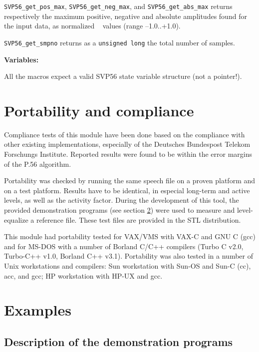 {\tt SVP56\_get\_pos\_max}, {\tt SVP56\_get\_neg\_max}, and 
{\tt SVP56\_get\_abs\_max} returns respectively the maximum
positive, negative and absolute amplitudes found for the input
data, as normalized \double~ values (range --1.0..+1.0).

{\tt SVP56\_get\_smpno} returns as a {\tt unsigned long} the
total number of samples.


{\bf Variables: }
  
All the macros expect a valid SVP56 state variable
structure (not a pointer!).


\section{Portability and compliance}

Compliance tests of this module have been done based on the compliance
with other existing implementations, especially of the Deutsches
Bundespost Telekom Forschungs Institute. Reported results were found to be
within the error margins of the P.56 algorithm.

Portability was checked by running the same speech file on a proven
platform and on a test platform. Results have to be identical, in
especial long-term and active levels, as well as the activity factor.
During the development of this tool, the provided demonstration programs (see
section \ref{sv56-examples}) were used to  measure and level-equalize
a reference file. These test files are provided in the STL
distribution.

This module had portability tested for VAX/VMS with VAX-C and GNU C
(gcc) and for MS-DOS with a number of Borland C/C++ compilers (Turbo
C v2.0, Turbo-C++ v1.0, Borland C++ v3.1). Portability was also
tested in a number of Unix workstations and compilers: Sun
workstation with Sun-OS and Sun-C (cc), acc, and gcc; HP workstation
with HP-UX and gcc.

\section {Examples} \label{sv56-examples}

\subsection {Description of the demonstration programs} 

